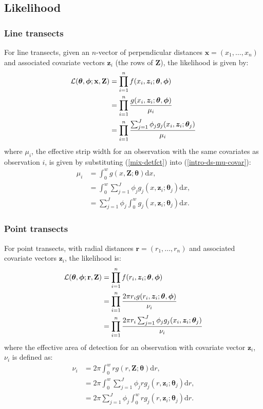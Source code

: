 \subsection{Likelihood}

\subsubsection{Line transects}

For line transects, given an $n$-vector of perpendicular distances $\mathbf{x}=\left ( x_1,\ldots,x_n \right )$ and associated covariate vectors $\bm{z}_i$ (the rows of $\mathbf{Z}$), the likelihood is given by:
\begin{align}
\mathcal{L}(\bm{\theta},\bm{\phi}; \mathbf{x},\mathbf{Z}) &= \prod_{i=1}^n f(x_i,\bm{z}_i; \bm{\theta},\bm{\phi}) \notag \\
&= \prod_{i=1}^n \frac{g(x_i,\bm{z}_i; \bm{\theta},\bm{\phi})}{\mu_i} \notag \\
&= \prod_{i=1}^n \frac{\sum_{j=1}^J \phi_j g_j(x_i,\bm{z}_i; \bm{\theta}_j)}{\mu_i} \label{lt-lik}
\end{align}
where $\mu_i$, the effective strip width for an observation with the same covariates as observation $i$, is given by substituting (\ref{mix-detfct}) into (\ref{intro-ds-mu-covar}):
\begin{align*}
\mu_{i} &= \int_0^w  g(x,\bm{Z}; \bm{\theta}) \text{d}x,\\
& =  \int_0^w  \sum_{j=1}^J \phi_j g_j(x,\bm{z}_i; \bm{\theta}_j) \text{d}x,\\
& = \sum_{j=1}^J \phi_j \int_0^w  g_j(x,\bm{z}_i; \bm{\theta}_j) \text{d}x.
\end{align*}

\subsubsection{Point transects}

For point transects, with radial distances $\mathbf{r}=\left (r_1,\ldots,r_n \right )$ and associated covariate vectors $\bm{z}_i$, the likelihood is:
\begin{align}
\mathcal{L}(\bm{\theta},\bm{\phi}; \mathbf{r},\mathbf{Z}) &= \prod_{i=1}^n f(r_i,\bm{z}_i; \bm{\theta},\bm{\phi}) \notag \\
&= \prod_{i=1}^n \frac{2 \pi r_i g(r_i,\bm{z}_i; \bm{\theta},\bm{\phi})}{\nu_i} \notag \\
&= \prod_{i=1}^n \frac{2 \pi r_i \sum_{j=1}^J \phi_j g_j(x_i,\bm{z}_i; \bm{\theta}_j)}{\nu_i} \label{pt-lik}
\end{align}
where the effective area of detection for an observation with covariate vector $\mathbf{z}_i$, $\nu_i$ is defined as:
\begin{align*}
\nu_i &= 2\pi \int_0^w  r g(r,\bm{Z}; \bm{\theta}) \text{d}r,\\
& = 2\pi  \int_0^w  \sum_{j=1}^J \phi_j r g_j(r,\bm{z}_i; \bm{\theta}_j) \text{d}r,\\
& = 2\pi \sum_{j=1}^J \phi_j \int_0^w  r g_j(r,\bm{z}_i; \bm{\theta}_j) \text{d}r.
\end{align*}

